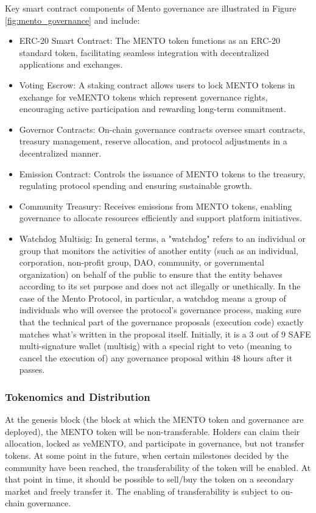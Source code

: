 \documentclass[a4paper]{article}
\theoremstyle{definition}
\begin{document}
Key smart contract components of Mento governance are illustrated in Figure \ref{fig:mento_governance} and include:
\begin{itemize}
    \item ERC-20 Smart Contract: The MENTO token functions as an ERC-20 standard token, facilitating seamless integration with decentralized applications and exchanges.
    \item Voting Escrow: A staking contract allows users to lock MENTO tokens in exchange for veMENTO tokens which represent governance rights, encouraging active participation and rewarding long-term commitment.
    \item Governor Contracts: On-chain governance contracts oversee smart contracts, treasury management, reserve allocation, and protocol adjustments in a decentralized manner.
    \item Emission Contract: Controls the issuance of MENTO tokens to the treasury, regulating protocol spending and ensuring sustainable growth.
    \item Community Treasury: Receives emissions from MENTO tokens, enabling governance to allocate resources efficiently and support platform initiatives.
    \item Watchdog Multisig: In general terms, a "watchdog" refers to an individual or group that monitors the activities of another entity (such as an individual, corporation, non-profit group, DAO, community, or governmental organization) on behalf of the public to ensure that the entity behaves according to its set purpose and does not act illegally or unethically. In the case of the Mento Protocol, in particular, a watchdog means a group of individuals who will oversee the protocol's governance process, making sure that the technical part of the governance proposals (execution code) exactly matches what's written in the proposal itself. Initially, it is a 3 out of 9 SAFE multi-signature wallet (multisig) with a special right to veto (meaning to cancel the execution of) any governance proposal within 48 hours after it passes.
\end{itemize}

\subsubsection{Tokenomics and Distribution}
At the genesis block (the block at which the MENTO token and governance are deployed), the MENTO token will be non-transferable. Holders can claim their allocation, locked as veMENTO, and participate in governance, but not transfer tokens. At some point in the future, when certain milestones decided by the community have been reached, the transferability of the token will be enabled. At that point in time, it should be possible to sell/buy the token on a secondary market and freely transfer it. The enabling of transferability is subject to on-chain governance.
\end{document}
